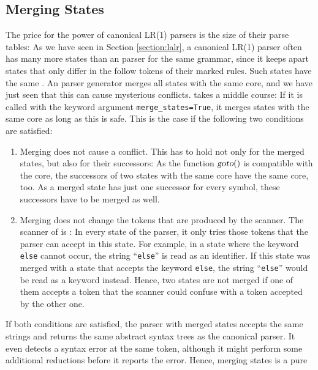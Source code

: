 \subsection{Merging States \label{section:merging-states}}
The price for the power of canonical LR(1) parsers is the size of their parse tables:  As we have seen in
Section \ref{section:lalr}, a canonical LR(1) parser often has many more states than an  parser
for the same grammar, since it keeps apart states that only differ in the follow tokens of their marked rules.
Such states have the same .  An  parser generator merges all states with the same core,
and we have just seen that this can cause mysterious conflicts.   takes a middle course:
If it is called with the keyword argument \texttt{merge\_states=True}, it merges states with the same core as long
as this is safe.  This is the case if the following two conditions are satisfied:
\begin{enumerate}
\item Merging does not cause a conflict.  This has to hold not only for the merged states, but also for their
      successors:  As the function $\textsl{goto}()$ is compatible with the core, the successors of two states with
      the same core have the same core, too.  As a merged state has just one successor for every symbol, these
      successors have to be merged as well.
\item Merging does not change the tokens that are produced by the scanner.  The scanner of 
      is :  In every state of the parser, it only tries those tokens
      that the parser can accept in this state.  For example, in a state where the keyword \texttt{else} cannot
      occur, the string ``\texttt{else}'' is read as an identifier.  If this state was merged with a state that
      accepts the keyword \texttt{else}, the string ``\texttt{else}'' would be read as a keyword instead.  Hence,
      two states are not merged if one of them accepts a token that the scanner could confuse with a token
      accepted by the other one.
\end{enumerate}
If both conditions are satisfied, the parser with merged states accepts the same strings and returns the same
abstract syntax trees as the canonical parser.  It even detects a syntax error at the same token, although it
might perform some additional reductions before it reports the error.  Hence, merging states is a pure
